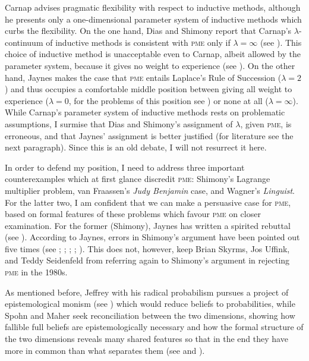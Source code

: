 \documentclass[phd,12pt,oneside]{ubcthesis}
\begin{document}
Carnap advises pragmatic flexibility with respect to inductive
methods, although he presents only a one-dimensional parameter system
of inductive methods which curbs the flexibility. On the one hand,
Dias and Shimony report that Carnap's $\lambda$-continuum of inductive
methods is consistent with \textsc{pme} only if $\lambda=\infty$ (see
). This choice of inductive method is
unacceptable even to Carnap, albeit allowed by the parameter system,
because it gives no weight to experience (see
). On the other hand, Jaynes makes the case
that \textsc{pme} entails Laplace's Rule of Succession ($\lambda=2$)
and thus occupies a comfortable middle position between giving all
weight to experience ($\lambda=0$, for the problems of this position
see ) or none at all ($\lambda=\infty$).
While Carnap's parameter system of inductive methods rests on
problematic assumptions, I surmise that Dias and Shimony's assignment
of $\lambda$, given \textsc{pme}, is erroneous, and that Jaynes'
assignment is better justified (for literature see the next
paragraph). Since this is an old debate, I will not resurrect it here.

In order to defend my position, I need to address three important
counterexamples which at first glance discredit \textsc{pme}:
Shimony's Lagrange multiplier problem, van Fraassen's \emph{Judy
  Benjamin} case, and Wagner's \emph{Linguist}. For the latter two, I
am confident that we can make a persuasive case for \textsc{pme},
based on formal features of these problems which favour \textsc{pme}
on closer examination. For the former (Shimony), Jaynes has written a
spirited rebuttal (see ). 
According to Jaynes, errors in Shimony's argument have been pointed
out five times (see ;
; ;
; ). This does not,
however, keep Brian Skyrms, Jos Uffink, and Teddy Seidenfeld from
referring again to Shimony's argument in rejecting \textsc{pme} in the
1980s.

As mentioned before, Jeffrey with his radical probabilism pursues a
project of epistemological monism (see ) which
would reduce beliefs to probabilities, while Spohn and Maher seek
reconciliation between the two dimensions, showing how fallible full
beliefs are epistemologically necessary and how the formal structure
of the two dimensions reveals many shared features so that in the end
they have more in common than what separates them (see
 and ).
\end{document}
